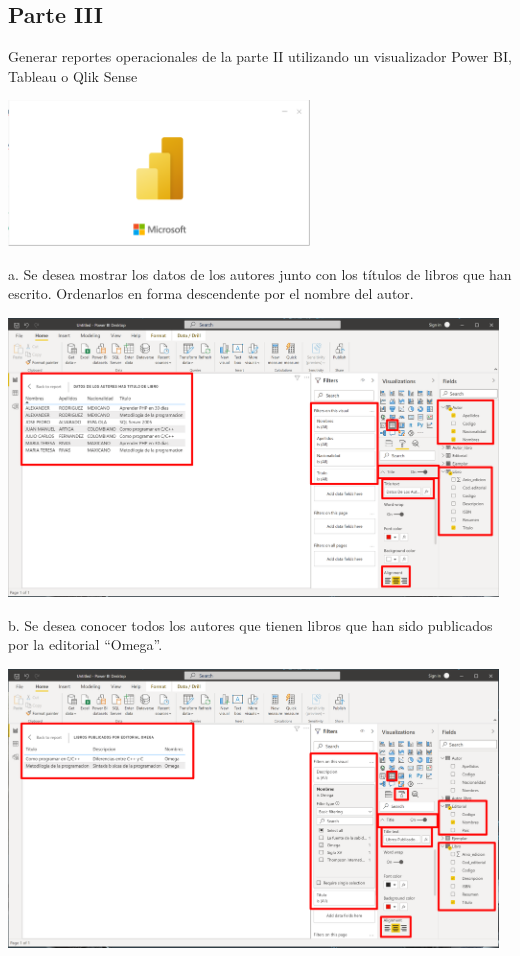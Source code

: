 \documentclass[12pt,letterpaper]{article}
\begin{document}
\subsection{Parte III}
Generar reportes operacionales de la parte II utilizando un visualizador Power BI, Tableau o
Qlik Sense
\begin{center}
    \includegraphics[width=8cm]{img/power.png}  
\end{center}
a. Se desea mostrar los datos de los autores junto con los títulos de libros que han escrito.
Ordenarlos en forma descendente por el nombre del autor.
\begin{center}
    \includegraphics[width=13cm]{img/26.png}  
\end{center}
b. Se desea conocer todos los autores que tienen libros que han sido publicados por la
editorial “Omega”.
\begin{center}
    \includegraphics[width=13cm]{img/27.png}  
\end{center}
\end{document}
